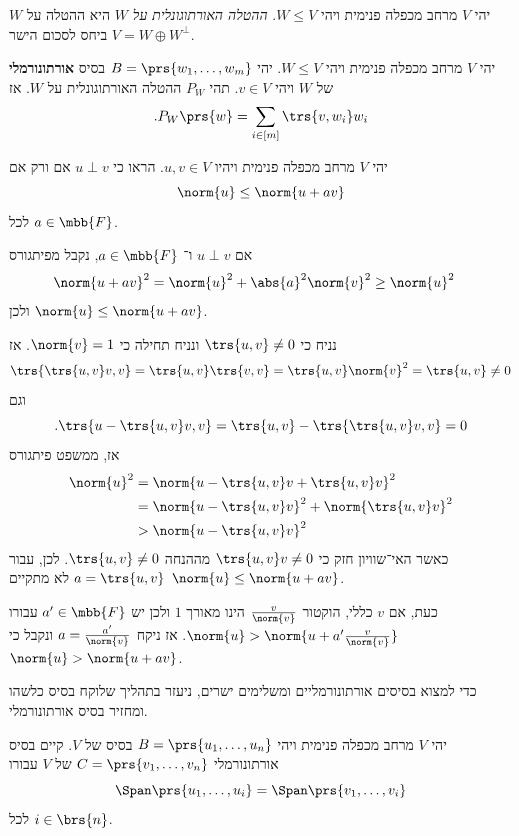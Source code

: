 \documentclass[a4paper,10pt,twoside,openany]{book}
\begin{document}
\begin{definition}
יהי
$V$
מרחב מכפלה פנימית ויהי
$W \leq V$.
\emph{ההטלה האורתוגונלית על
$W$}
היא ההטלה על
$W$
ביחס לסכום הישר
$V = W \oplus W^\perp$.
\end{definition}

\begin{proposition}
יהי
$V$
מרחב מכפלה פנימית ויהי
$W \leq V$.
יהי
$B = \prs{w_1, \ldots, w_m}$
בסיס
\textbf{אורתונורמלי}
של
$W$
ויהי
$v \in V$.
תהי
$P_W$
ההטלה האורתוגונלית על
$W$.
אז
\[\text{.} P_W\prs{w} = \sum_{i \in [m]} \trs{v, w_i} w_i\]
\end{proposition}

\begin{exercisechap}
יהי
$V$
מרחב מכפלה פנימית ויהיו
$u,v \in V$.
הראו כי
$u \perp v$
אם ורק אם
\[\norm{u} \leq \norm{u+av}\]
לכל
$a \in \mbb{F}$.
\end{exercisechap}

\begin{solution}
אם
$u \perp v$
ו־%
$a \in \mbb{F}$,
נקבל מפיתגורס
\begin{align*}
\norm{u+av}^2 &= \norm{u}^2 + \abs{a}^2 \norm{v}^2 \geq \norm{u}^2
\end{align*}
ולכן
$\norm{u} \leq \norm{u+av}$.

נניח כי
$\trs{u,v} \neq 0$
ונניח תחילה כי
$\norm{v} = 1$.
אז
\[\trs{\trs{u,v}v, v} = \trs{u,v} \trs{v,v} = \trs{u,v} \norm{v}^2 = \trs{u,v} \neq 0\]
וגם
\[\text{.} \trs{u - \trs{u,v}v, v} = \trs{u,v} - \trs{\trs{u,v}v,v} = 0\]
אז, ממשפט פיתגורס
\begin{align*}
\norm{u}^2 &= \norm{u - \trs{u,v}v + \trs{u,v}v}^2
\\&=
\norm{u - \trs{u,v}v}^2 + \norm{\trs{u,v}v}^2
\\&>
\norm{u-\trs{u,v}v}^2
\end{align*}
כאשר האי־שוויון חזק כי
$\trs{u,v}v \neq 0$
מההנחה
$\trs{u,v} \neq 0$.
לכן, עבור
$a = \trs{u,v}$
לא מתקיים
$\norm{u} \leq \norm{u+av}$.

כעת, אם
$v$
כללי, הוקטור
$\frac{v}{\norm{v}}$
הינו מאורך
$1$
ולכן יש
$a' \in \mbb{F}$
עבורו
$\norm{u} > \norm{u+a' \frac{v}{\norm{v}}}$.
אז ניקח
$a = \frac{a'}{\norm{v}}$
ונקבל כי
$\norm{u} > \norm{u + av}$.
\end{solution}

כדי למצוא בסיסים אורתונורמליים ומשלימים ישרים, ניעזר בתהליך שלוקח בסיס כלשהו ומחזיר בסיס אורתונורמלי.

\begin{theorem}
יהי
$V$
מרחב מכפלה פנימית ויהי
$B = \prs{u_1, \ldots, u_n}$
בסיס של
$V$.
קיים בסיס אורתונורמלי
$C = \prs{v_1, \ldots, v_n}$
של
$V$
עבורו
\[\Span\prs{u_1, \ldots, u_i} = \Span\prs{v_1, \ldots, v_i}\]
לכל
$i \in \brs{n}$.
\end{theorem}
\end{document}
